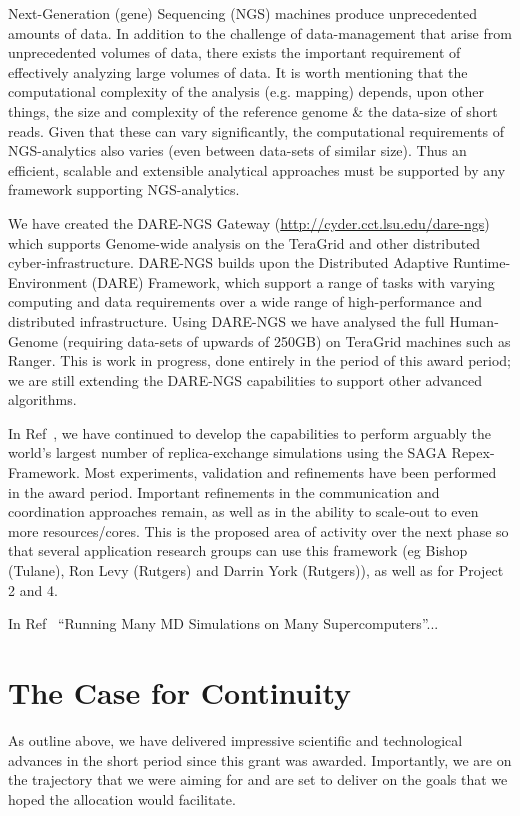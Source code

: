 \documentclass[a4paper,10pt]{article}
\begin{document}
Next-Generation (gene) Sequencing (NGS) machines produce unprecedented amounts of data.  In addition to the challenge of data-management that arise from unprecedented volumes of data, there exists the important requirement of effectively analyzing large volumes of data.  It is worth mentioning that the computational complexity of the analysis (e.g. mapping) depends, upon other things, the size and complexity of the reference genome \& the data-size of short reads.  Given that these can vary significantly, the computational requirements of NGS-analytics also varies (even between data-sets of similar size).  Thus an efficient, scalable and extensible analytical approaches must be supported by any framework supporting NGS-analytics.

We have created the DARE-NGS Gateway (\url{http://cyder.cct.lsu.edu/dare-ngs}) which supports Genome-wide analysis on the TeraGrid and other distributed cyber-infrastructure.  DARE-NGS builds upon the Distributed Adaptive Runtime-Environment (DARE) Framework, which support a range of tasks with varying computing and data requirements over a wide range of high-performance and distributed infrastructure.  Using DARE-NGS we have analysed the full Human-Genome (requiring data-sets of upwards of 250GB) on TeraGrid machines such as Ranger. This is work in progress, done entirely in the period of this award period; we are still extending the DARE-NGS capabilities to support other advanced algorithms\cite{ecmls11}.

In Ref~\cite{async-re}, we have continued to develop the capabilities to perform arguably the world's largest number of replica-exchange simulations using the SAGA Repex-Framework. Most experiments, validation and refinements have been performed in the award period. Important refinements in the communication and coordination approaches remain, as well as in the ability to scale-out to even more resources/cores. This is the proposed area of activity over the next phase so that several application research groups can use this framework (eg Bishop (Tulane), Ron Levy (Rutgers) and Darrin York (Rutgers)), as well as for Project 2 and 4.

In Ref~\cite{} ``Running Many MD Simulations on Many Supercomputers''...


\section{The Case for Continuity}

As outline above, we have delivered impressive scientific and technological advances in the short period since this grant was awarded. Importantly, we are on the trajectory that we were aiming for and are set to deliver on the goals that we hoped the allocation would facilitate.
\end{document}
